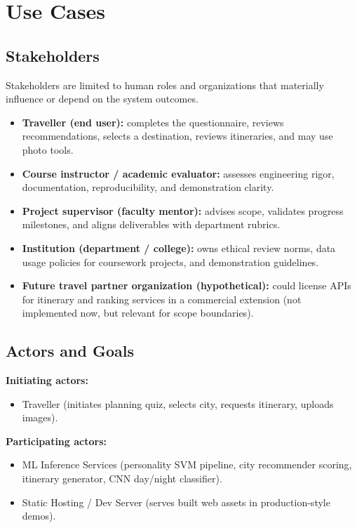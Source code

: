 \documentclass[12pt,oneside,openany]{report}
\begin{document}
\chapter{Use Cases}

\section{Stakeholders}

Stakeholders are limited to human roles and organizations that materially influence or depend on the system outcomes.

\begin{itemize}
\item \textbf{Traveller (end user):} completes the questionnaire, reviews recommendations, selects a destination, reviews itineraries, and may use photo tools.
\item \textbf{Course instructor / academic evaluator:} assesses engineering rigor, documentation, reproducibility, and demonstration clarity.
\item \textbf{Project supervisor (faculty mentor):} advises scope, validates progress milestones, and aligns deliverables with department rubrics.
\item \textbf{Institution (department / college):} owns ethical review norms, data usage policies for coursework projects, and demonstration guidelines.
\item \textbf{Future travel partner organization (hypothetical):} could license APIs for itinerary and ranking services in a commercial extension (not implemented now, but relevant for scope boundaries).
\end{itemize}

\section{Actors and Goals}

\textbf{Initiating actors:}
\begin{itemize}[nosep]
\item Traveller (initiates planning quiz, selects city, requests itinerary, uploads images).
\end{itemize}

\textbf{Participating actors:}
\begin{itemize}[nosep]
\item ML Inference Services (personality SVM pipeline, city recommender scoring, itinerary generator, CNN day/night classifier).
\item Static Hosting / Dev Server (serves built web assets in production-style demos).
\end{itemize}
\end{document}
